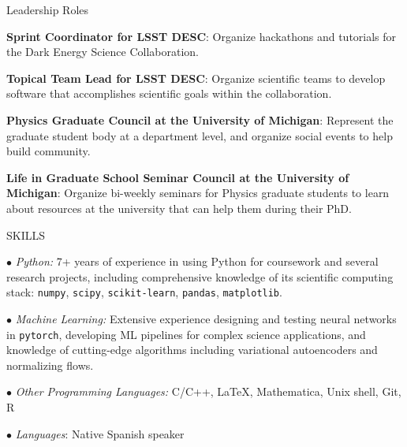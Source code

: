 \documentclass{resume} %
\newcommand{\pytorch}[0]{\texttt{pytorch}}
\begin{document}
\begin{rSection}{Leadership Roles} \itemsep -3pt \vspace*{-.25cm}
\item{\textbf{Sprint Coordinator for LSST DESC}: Organize hackathons and tutorials for the Dark Energy Science Collaboration.}

\item{\textbf{Topical Team Lead for LSST DESC}: Organize scientific teams to develop software that accomplishes scientific goals within the collaboration.}

\item{\textbf{Physics Graduate Council at the University of Michigan}: Represent the graduate student body at a department level, and organize social events to help build community.}

\item{\textbf{Life in Graduate School Seminar Council at the University of Michigan}: Organize bi-weekly seminars for Physics graduate students to learn about resources at the university that can help them during their PhD.}
\end{rSection}


\begin{rSection}{SKILLS}
\vspace*{-0.3cm}
\item {\small $\bullet$} \textit{Python:} 7+ years of experience in using Python for coursework and several research projects, including comprehensive knowledge of its scientific computing stack: \texttt{numpy}, \texttt{scipy}, \texttt{scikit-learn}, \texttt{pandas}, \texttt{matplotlib}.

\item {\small $\bullet$} \textit{Machine Learning:} Extensive experience designing and testing neural networks in \pytorch, developing ML pipelines for complex science applications, and knowledge of cutting-edge algorithms including variational autoencoders and normalizing flows.

\item {\small $\bullet$} \textit{Other Programming Languages:} C/C++, \LaTeX, Mathematica, Unix shell, Git, R      

\item {\small $\bullet$} \textit{Languages}: Native Spanish speaker
\end{rSection}
\end{document}
